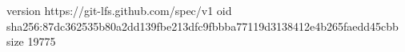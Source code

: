 version https://git-lfs.github.com/spec/v1
oid sha256:87dc362535b80a2dd139fbe213dfc9fbbba77119d3138412e4b265faedd45cbb
size 19775
